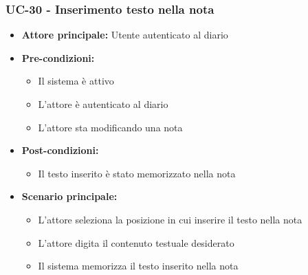 \documentclass[a4paper,12pt]{article}
\begin{document}
\subsubsection{UC-30 - Inserimento testo nella nota} \label{subsec:UC-30}
\begin{itemize}
    \item \textbf{Attore principale:} Utente autenticato al diario
    \item \textbf{Pre-condizioni:}
    \begin{itemize}
        \item Il sistema è attivo
        \item L'attore è autenticato al diario
        \item L'attore sta modificando una nota
    \end{itemize}
    \item \textbf{Post-condizioni:} 
    \begin{itemize}
        \item Il testo inserito è stato memorizzato nella nota
    \end{itemize}
    \item \textbf{Scenario principale:} 
    \begin{itemize}
        \item L'attore seleziona la posizione in cui inserire il testo nella nota
        \item L'attore digita il contenuto testuale desiderato
        \item Il sistema memorizza il testo inserito nella nota
    \end{itemize}
\end{itemize}
\end{document}
